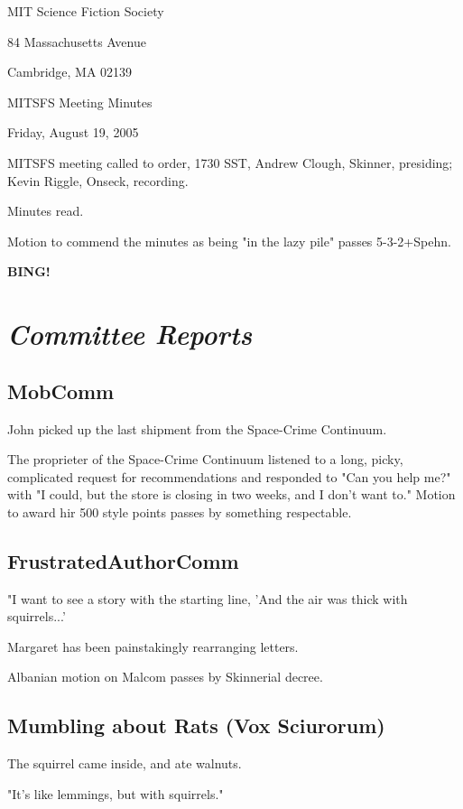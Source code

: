 \documentclass[10pt]{article}
\newcommand{\bing}{{\bf BING!} }
\newcommand{\goto}[1]{\bing \vskip 12pt \section*{{\em{#1}}}}
\begin{document}
\begin{center}

MIT Science Fiction Society

84 Massachusetts Avenue

Cambridge, MA 02139

\vspace{12pt}

MITSFS Meeting Minutes

Friday, August 19, 2005

\end{center}

\vspace{18pt}

\setlength{\parskip}{6pt}

\noindent
MITSFS meeting called to order, 1730 SST, Andrew Clough, 
Skinner, presiding; Kevin Riggle,  Onseck, recording.

Minutes read.

Motion to commend the minutes as being "in the lazy pile" passes 5-3-2+Spehn.

\goto{Committee Reports}
\subsection*{MobComm}
John picked up the last shipment from the Space-Crime Continuum.  

The proprieter of the Space-Crime Continuum listened to a long, picky,
complicated request for recommendations and responded to "Can you help me?" with "I could, but
the store is closing in two weeks, and I don't want to."  Motion to award hir 500 style points 
passes by something respectable.

\subsection*{FrustratedAuthorComm}
"I want to see a story with the starting line, 'And the air was thick with squirrels...'

Margaret has been painstakingly rearranging letters.

Albanian motion on Malcom passes by Skinnerial decree.

\subsection*{Mumbling about Rats (Vox Sciurorum)}
The squirrel came inside, and ate walnuts.

"It's like lemmings, but with squirrels."
\end{document}
